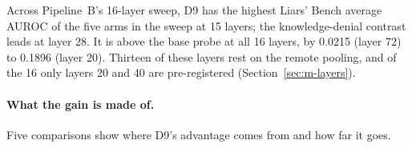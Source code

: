 Across Pipeline~B's 16-layer sweep, D9 has the highest Liars' Bench average AUROC of the five arms in the sweep at 15 layers; the knowledge-denial contrast leads at layer 28. %
It is above the base probe at all 16 layers, by 0.0215 (layer 72) to 0.1896 (layer 20). %
Thirteen of these layers rest on the remote pooling, and of the 16 only layers 20 and 40 are pre-registered (Section~\ref{sec:m-layers}). %

\paragraph{What the gain is made of.} Five comparisons show where D9's advantage comes from and how far it goes.

